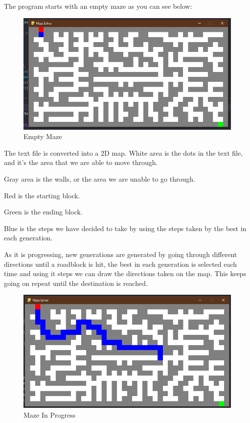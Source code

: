 \documentclass{article}
\begin{document}
The program starts with an empty maze as you can see below:

\begin{figure}[htb!]
\centerline
{\includegraphics[width=130mm,scale=1.0]{emptmaze.png}}
\caption{Empty Maze}
\end{figure}

The text file is converted into a 2D map. White area is the dots in the text file, and it's the area that we are able to move through.

Gray area is the walls, or the area we are unable to go through.

Red is the starting block.

Green is the ending block.

Blue is the steps we have decided to take by using the steps taken by the best in each generation.

\newpage

As it is progressing, new generations are generated by going through different directions until a roadblock is hit, the best in each generation is selected each time and using it steps we can draw the directions taken on the map. This keeps going on repeat until the destination is reached.

\begin{figure}[htb!]
\centerline
{\includegraphics[width=130mm,scale=1.0]{mazeinprogress.png}}
\caption{Maze In Progress}
\end{figure}
\end{document}
